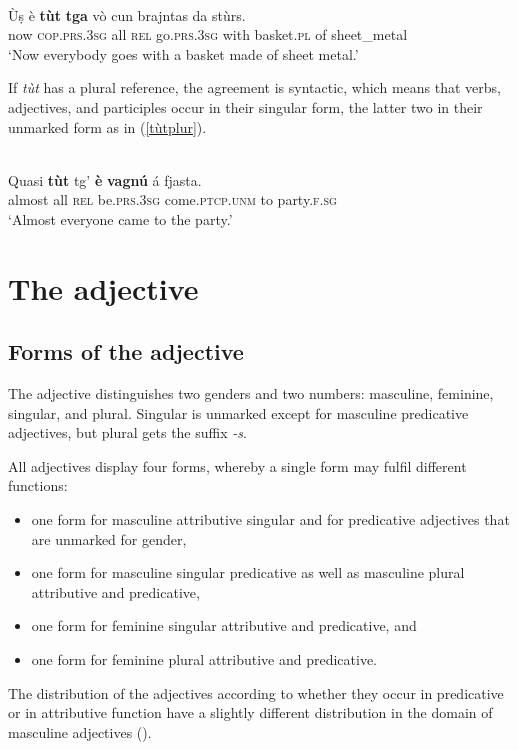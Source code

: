 \ea
\label{}
\\
\gll  Ùṣ è \textbf{tùt} \textbf{tga} vò cun brajntas da stùrs.\\
now \textsc{cop.prs.3sg} all \textsc{rel} go.\textsc{prs.3sg} with basket.\textsc{pl} of sheet\_metal\\
\glt `Now everybody goes with a basket made of sheet metal.'
\z

If \textit{tùt} has a plural reference, the agreement is syntactic, which means that verbs, adjectives, and participles occur in their singular form, the latter two in their unmarked form as in (\ref{tùtplur}).

\ea\label{tùtplur}
\\
\gll  Quasi \textbf{tùt} tg' \textbf{è} \textbf{vagnú} á fjasta.\\
almost all \textsc{rel} be.\textsc{prs.3sg} come.\textsc{ptcp.unm} to party.\textsc{f.sg}\\
\glt `Almost everyone came to the party.'
\z


\section{The adjective}
\subsection{Forms of the adjective}
The adjective distinguishes two genders and two numbers: masculine, feminine, singular, and plural. Singular is unmarked except for masculine predicative adjectives, but plural gets the suffix \textit{-s}.

All adjectives display four forms, whereby a single form may fulfil different functions:

\begin{itemize}
\item one form for masculine attributive singular and for predicative adjectives that are unmarked for gender,
\item one form for masculine singular predicative as well as masculine plural attributive and predicative,
\item one form for feminine singular attributive and predicative, and
\item one form for feminine plural attributive and predicative.
\end{itemize}

The distribution of the adjectives according to whether they occur in predicative or in attributive function have a slightly different distribution in the domain of masculine adjectives ().


